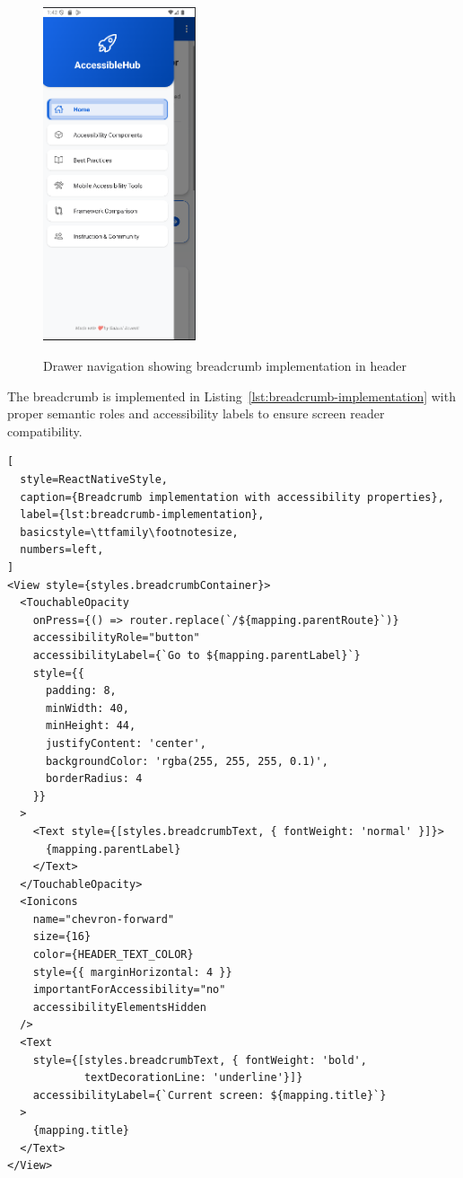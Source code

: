 \begin{figure}[ht]
    \centering
    \includegraphics[width=0.4\textwidth, alt={Drawer navigation with breadcrumb in header}]{img/drawer.png}
    \caption{Drawer navigation showing breadcrumb implementation in header}\label{fig:drawer-navigation}
\end{figure}

\FloatBarrier

The breadcrumb is implemented in Listing~\ref{lst:breadcrumb-implementation} with proper semantic roles and accessibility labels to ensure screen reader compatibility.

\begin{lstlisting}[
  style=ReactNativeStyle,
  caption={Breadcrumb implementation with accessibility properties},
  label={lst:breadcrumb-implementation},
  basicstyle=\ttfamily\footnotesize,
  numbers=left,
]
<View style={styles.breadcrumbContainer}>
  <TouchableOpacity
    onPress={() => router.replace(`/${mapping.parentRoute}`)}
    accessibilityRole="button"
    accessibilityLabel={`Go to ${mapping.parentLabel}`}
    style={{
      padding: 8,
      minWidth: 40,
      minHeight: 44,
      justifyContent: 'center',
      backgroundColor: 'rgba(255, 255, 255, 0.1)',
      borderRadius: 4
    }}
  >
    <Text style={[styles.breadcrumbText, { fontWeight: 'normal' }]}>
      {mapping.parentLabel}
    </Text>
  </TouchableOpacity>
  <Ionicons
    name="chevron-forward"
    size={16}
    color={HEADER_TEXT_COLOR}
    style={{ marginHorizontal: 4 }}
    importantForAccessibility="no"
    accessibilityElementsHidden
  />
  <Text
    style={[styles.breadcrumbText, { fontWeight: 'bold', 
            textDecorationLine: 'underline'}]}
    accessibilityLabel={`Current screen: ${mapping.title}`}
  >
    {mapping.title}
  </Text>
</View>
\end{lstlisting}

